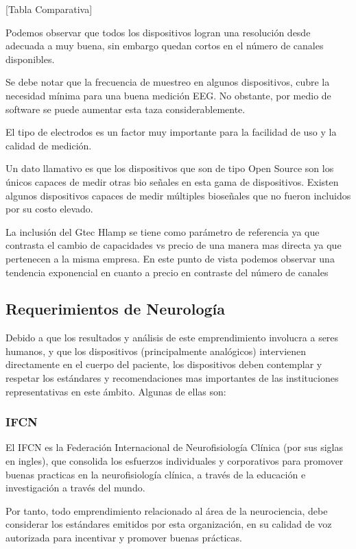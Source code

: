 \documentclass[11pt]{article}
\begin{document}
[Tabla Comparativa]

Podemos observar que todos los dispositivos logran una resolución desde adecuada a muy buena, sin embargo quedan cortos en el número de canales disponibles.

Se debe notar que la frecuencia de muestreo en algunos dispositivos, cubre la necesidad mínima para una buena medición EEG. No obstante, por medio de software se puede aumentar esta taza considerablemente.

El tipo de electrodos es un factor muy importante para la facilidad de uso y la calidad de medición.

Un dato llamativo es que los dispositivos que son de tipo Open Source son los únicos capaces de medir otras bio señales en esta gama de dispositivos. Existen algunos dispositivos capaces de medir múltiples bioseñales que no fueron incluidos por su costo elevado.

La inclusión del Gtec Hlamp se tiene como parámetro de referencia ya que contrasta el cambio de capacidades vs precio de una manera mas directa ya que pertenecen a la misma empresa. En este punto de vista podemos observar una tendencia exponencial en cuanto a precio en contraste del número de canales

\subsection{Requerimientos de Neurología}
\label{sec:org23fbaf8}
Debido a que los resultados y análisis de este emprendimiento involucra a seres humanos, y que los dispositivos (principalmente analógicos) intervienen directamente en el cuerpo del paciente, los dispositivos deben contemplar y respetar los estándares y recomendaciones mas importantes de las instituciones representativas en este ámbito. Algunas de ellas son:

\subsubsection{IFCN}
\label{sec:org63c85fd}
El IFCN es la Federación Internacional de Neurofisiología Clínica (por sus siglas en ingles), que consolida los esfuerzos individuales y corporativos para promover buenas practicas en la neurofisiología clínica, a través de la educación e investigación a través del mundo.

Por tanto, todo emprendimiento relacionado al área de la neurociencia, debe considerar los estándares emitidos por esta organización, en su calidad de voz autorizada para incentivar y promover buenas prácticas.
\end{document}
